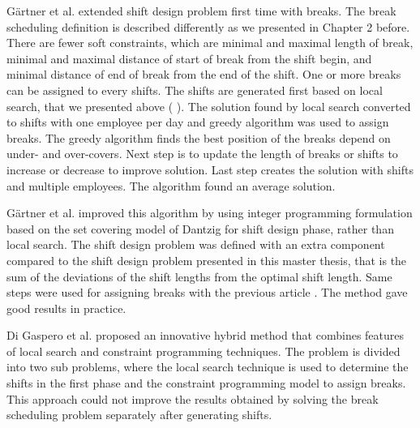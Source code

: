 G\"artner et al. \cite{li:2005:gaertner} extended shift design problem first time with breaks. The break scheduling definition is described differently as we presented in Chapter 2 before. There are fewer soft constraints, which are minimal and maximal length of break, minimal and maximal distance of start of break from the shift begin, and minimal distance of end of break from the end of the shift. One or more breaks can be assigned to every shifts. The shifts are generated first based on local search, that we presented above (\cite{li:2001:gärtner} \cite{li:2004:musliu}). The solution found by local search converted to shifts with one employee per day and greedy algorithm was used to assign breaks. The greedy algorithm finds the best position of the breaks depend on under- and over-covers. Next step is to update the length of breaks or shifts to increase or decrease to improve solution. Last step creates the solution with shifts and multiple employees. The algorithm found an average solution. 

G\"artner et al. \cite{li:2006:gaertner} improved this algorithm by using integer programming formulation based on the set covering model of Dantzig  \cite{li:1954:dantzig} for shift design phase, rather than local search. The shift design problem was defined with an extra component compared to the shift design problem presented in this master thesis, that is the sum of the deviations of the shift lengths from the optimal shift length. Same steps were used for assigning breaks with the previous article \cite{li:2005:gaertner}. The method gave good results in practice. 

Di Gaspero et al. \cite{li:2010:gaspero} \cite{li:2013:gaspero} proposed an innovative hybrid method that combines features of local search and constraint programming  techniques. The problem is divided into two sub problems, where the local search technique is used to determine the shifts in the first phase and the constraint programming model to assign breaks. This approach could not improve the results obtained by solving the break scheduling problem separately after generating shifts. 
